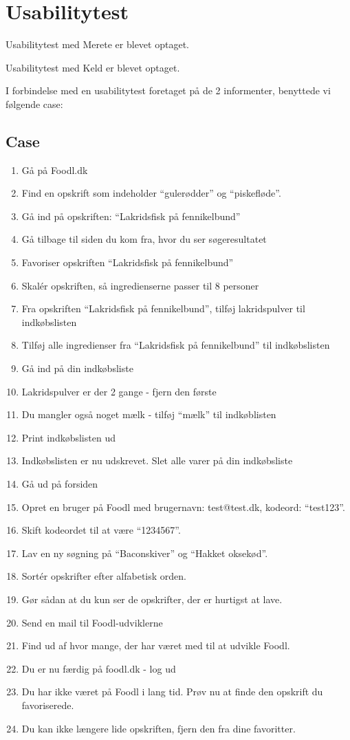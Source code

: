 \chapter{Usabilitytest}
\label{ap:usabilitytest}

Usabilitytest med Merete er blevet optaget\cite{usabilitymerete}.

Usabilitytest med Keld er blevet optaget\cite{usabilitykeld}.

I forbindelse med en usabilitytest foretaget på de 2 informenter, benyttede vi følgende case:

\section{Case}
\begin{enumerate}
\item Gå på Foodl.dk
\item Find en opskrift som indeholder ``gulerødder'' og ``piskefløde''.
\item Gå ind på opskriften: ``Lakridsfisk på fennikelbund''
\item Gå tilbage til siden du kom fra, hvor du ser søgeresultatet
\item Favoriser opskriften ``Lakridsfisk på fennikelbund''
\item Skalér opskriften, så ingredienserne passer til 8 personer
\item Fra opskriften ``Lakridsfisk på fennikelbund'', tilføj lakridspulver til indkøbslisten
\item Tilføj alle ingredienser fra ``Lakridsfisk på fennikelbund'' til indkøbslisten
\item Gå ind på din indkøbsliste
\item Lakridspulver er der 2 gange - fjern den første
\item Du mangler også noget mælk - tilføj ``mælk'' til indkøblisten
\item Print indkøbslisten ud
\item Indkøbslisten er nu udskrevet. Slet alle varer på din indkøbsliste
\item Gå ud på forsiden
\item Opret en bruger på Foodl med brugernavn: test@test.dk, kodeord: ``test123''.
\item Skift kodeordet til at være “1234567”.
\item Lav en ny søgning på ``Baconskiver'' og ``Hakket oksekød''.
\item Sortér opskrifter efter alfabetisk orden.
\item Gør sådan at du kun ser de opskrifter, der er hurtigst at lave.
\item Send en mail til Foodl-udviklerne
\item Find ud af hvor mange, der har været med til at udvikle Foodl.
\item Du er nu færdig på foodl.dk - log ud
\item Du har ikke været på Foodl i lang tid. Prøv nu at finde den opskrift du favoriserede.
\item Du kan ikke længere lide opskriften, fjern den fra dine favoritter.
\end{enumerate}
